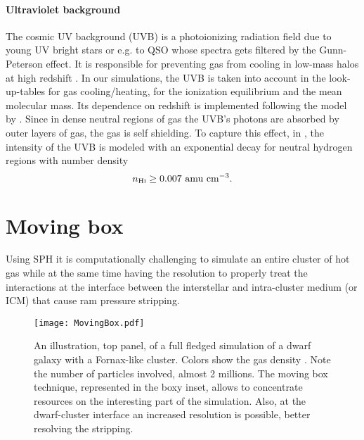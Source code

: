 \paragraph{Ultraviolet background}
The cosmic UV background (UVB) is a photoionizing radiation field due to young UV bright stars or e.g. to QSO whose spectra gets filtered by the Gunn-Peterson effect. It is responsible for preventing gas from cooling in low-mass halos at high redshift \citep{Efstathiou1992, Navarro1997}.
In our simulations, the UVB is taken into account in the look-up-tables for gas cooling/heating, for the ionization equilibrium and the mean molecular mass. Its dependence on redshift is implemented following the model by \citet{Faucher-Giguere2009}.
Since in dense neutral regions of gas the UVB's photons are absorbed by outer layers of gas, the gas is self shielding. To capture this effect, in \citet{DeRijcke2013}, the intensity of the UVB is modeled with an exponential decay for neutral hydrogen regions with number density \[n_{\text{H}\textsc i} \geq 0.007 \text{~amu~cm}^{-3}.\]


\section{Moving box}
\label{sec:MovingBox}
Using SPH it is computationally challenging to simulate an entire cluster of hot gas while at the same time having the resolution to properly treat the interactions at the interface between the interstellar and intra-cluster medium (or ICM) that cause ram pressure stripping.

\begin{figure}[ht]
 \centering
 \texttt{[image: MovingBox.pdf]}
 \caption{An illustration, top panel, of a full fledged simulation of a dwarf galaxy with a Fornax-like cluster.
 Colors show the gas density \citep[using the \texttt{glnemo2} software][]{Lambert2012}.
 Note the number of particles involved, almost 2 millions.
 The moving box technique, represented in the boxy inset, allows to concentrate resources on the interesting part of the simulation.
 Also, at the dwarf-cluster interface an increased resolution is possible, better resolving the stripping.}
 \label{fig:MovingBox}
\end{figure}

